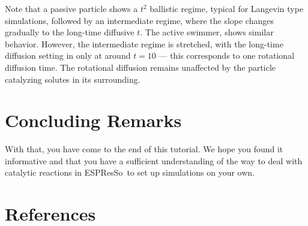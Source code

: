 \documentclass[aip,jcp,reprint,a4paper,onecolumn,nofootinbib,amsmath,amssymb]{revtex4-1}
\newcommand{\es}{\mbox{\textsf{ESPResSo}}\xspace}
\begin{document}
Note that a passive particle shows a $t^{2}$ ballistic regime, typical for Langevin type simulations, followed by an intermediate regime, where the slope changes gradually to the long-time diffusive $t$. The active swimmer, shows similar behavior. However, the intermediate regime is stretched, with the long-time diffusion setting in only at around $t = 10$  --- this corresponds to one rotational diffusion time. The rotational diffusion remains unaffected by the particle catalyzing solutes in its surrounding.

\section{Concluding Remarks}

With that, you have come to the end of this tutorial. We hope you found it informative and that you have a sufficient understanding of the way to deal with catalytic reactions in \es\ to set up simulations on your own.

\section*{References}



\end{document}
